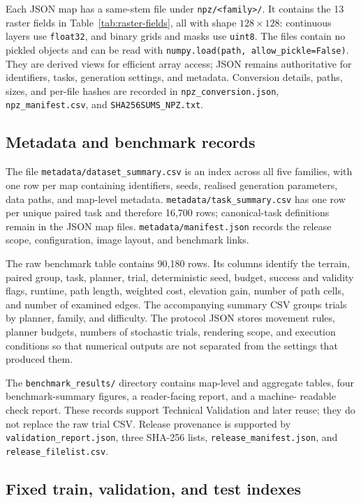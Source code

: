 \documentclass[11pt]{article}
\begin{document}
Each JSON map has a same-stem file under \texttt{npz/<family>/}. It contains
the 13 raster fields in Table~\ref{tab:raster-fields}, all with shape
$128\times128$: continuous layers use \texttt{float32}, and binary grids and
masks use \texttt{uint8}. The files contain no pickled objects and can be read
with \texttt{numpy.load(path, allow\_pickle=False)}. They are derived views for
efficient array access; JSON remains authoritative for identifiers, tasks,
generation settings, and metadata. Conversion details, paths, sizes, and
per-file hashes are recorded in \texttt{npz\_conversion.json},
\texttt{npz\_manifest.csv}, and \texttt{SHA256SUMS\_NPZ.txt}.

\subsection{Metadata and benchmark records}

The file \texttt{metadata/dataset\_summary.csv} is an index across all five
families, with one row per map containing identifiers, seeds, realised
generation parameters, data paths, and map-level metadata.
\texttt{metadata/task\_summary.csv} has one row per unique paired task and
therefore 16,700 rows; canonical-task definitions remain in the JSON map files.
\texttt{metadata/manifest.json} records the release scope, configuration, image
layout, and benchmark links.

The raw benchmark table contains 90,180 rows. Its columns identify the terrain,
paired group, task, planner, trial, deterministic seed, budget, success and
validity flags, runtime, path length, weighted cost, elevation gain, number of
path cells, and number of examined edges. The accompanying summary CSV groups
trials by planner, family, and difficulty. The protocol JSON stores movement
rules, planner budgets, numbers of stochastic trials, rendering scope, and
execution conditions so that numerical outputs are not separated from the
settings that produced them.

The \texttt{benchmark\_results/} directory contains map-level and aggregate
tables, four benchmark-summary figures, a reader-facing report, and a machine-
readable check report. These records support Technical Validation and later
reuse; they do not replace the raw trial CSV. Release provenance is supported
by \texttt{validation\_report.json}, three SHA-256 lists,
\texttt{release\_manifest.json}, and \texttt{release\_filelist.csv}.

\subsection{Fixed train, validation, and test indexes}
\end{document}
